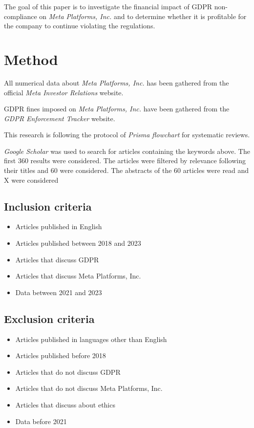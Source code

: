 \documentclass[12pt, a4paper]{article}
\begin{document}
The goal of this paper is to investigate the financial impact of GDPR
non-compliance on \textit{Meta Platforms, Inc.} and to determine whether it is
profitable for the company to continue violating the regulations.

\section*{Method}

All numerical data about \textit{Meta Platforms, Inc.} has been gathered from
the official \textit{Meta Investor Relations} website\cite{fbMetaFinancials}.

GDPR fines imposed on \textit{Meta Platforms, Inc.} have been gathered from the
\textit{GDPR Enforcement Tracker}
website\cite{enforcementtrackerGDPREnforcement}.

This research is following the protocol of \textit{Prisma flowchart} for
systematic reviews\cite{prismaFlowchart}.

\textit{Google Scholar} was used to search for articles containing the keywords
above. The first 360 results were considered. The articles were filtered by
relevance following their titles and 60 were considered. The abstracts of the 60
articles were read and X were considered

\subsection*{Inclusion criteria}

\begin{itemize}
    \item Articles published in English
    \item Articles published between 2018 and 2023
    \item Articles that discuss GDPR
    \item Articles that discuss Meta Platforms, Inc.
    \item Data between 2021 and 2023
\end{itemize}

\subsection*{Exclusion criteria}

\begin{itemize}
    \item Articles published in languages other than English
    \item Articles published before 2018
    \item Articles that do not discuss GDPR
    \item Articles that do not discuss Meta Platforms, Inc.
    \item Articles that discuss about ethics
    \item Data before 2021
\end{itemize}
\end{document}
